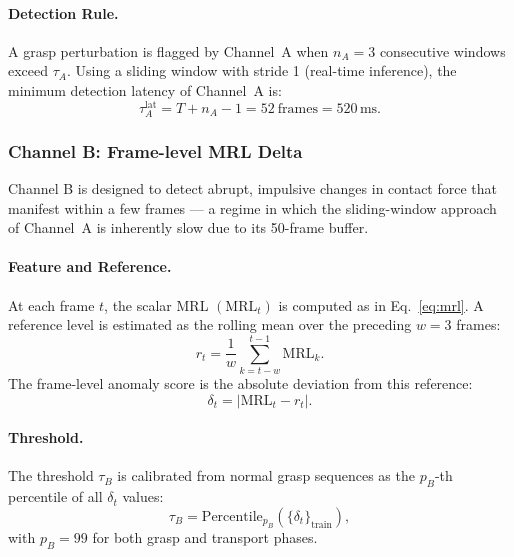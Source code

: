 \documentclass[pdflatex,sn-mathphys-num]{sn-jnl}%
\theoremstyle{thmstyleone}%
\theoremstyle{thmstyletwo}%
\theoremstyle{thmstylethree}%
\begin{document}
\paragraph{Detection Rule.}
A grasp perturbation is flagged by Channel~A when $n_A = 3$ consecutive windows exceed $\tau_A$. Using a sliding window with stride 1 (real-time inference), the minimum detection latency of Channel~A is:
\begin{equation}
    \tau^{\mathrm{lat}}_A = T + n_A - 1 = 52\ \text{frames} = 520\,\mathrm{ms}.
    \label{eq:latency_a}
\end{equation}

\subsubsection{Channel B: Frame-level MRL Delta}
\label{sec:channel_b}

Channel B is designed to detect abrupt, impulsive changes in contact force that manifest within a few frames — a regime in which the sliding-window approach of Channel~A is inherently slow due to its 50-frame buffer.

\paragraph{Feature and Reference.}
At each frame $t$, the scalar MRL $(\mathrm{MRL}_t)$ is computed as in Eq.~\eqref{eq:mrl}. A reference level is estimated as the rolling mean over the preceding $w = 3$ frames:
\begin{equation}
    r_t = \frac{1}{w}\sum_{k=t-w}^{t-1} \mathrm{MRL}_k.
    \label{eq:reference_b}
\end{equation}
The frame-level anomaly score is the absolute deviation from this reference:
\begin{equation}
    \delta_t = \left|\mathrm{MRL}_t - r_t\right|.
    \label{eq:delta_b}
\end{equation}

\paragraph{Threshold.}
The threshold $\tau_B$ is calibrated from normal grasp sequences as the $p_B$-th percentile of all $\delta_t$ values:
\begin{equation}
    \tau_B = \mathrm{Percentile}_{p_B}\!\left(\{\delta_t\}_{\text{train}}\right),
    \label{eq:threshold_b}
\end{equation}
with $p_B = 99$ for both grasp and transport phases.
\end{document}
